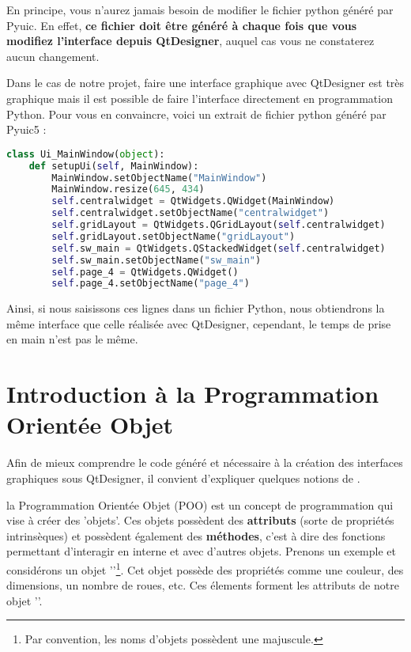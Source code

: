 \documentclass[12pt]{report}    %
\begin{document}
En  principe,  vous  n’aurez  jamais  besoin  de  modifier  le  fichier  python généré par Pyuic. En  effet, \textbf{{\color{red}ce  fichier  doit être généré à chaque  fois  que  vous  modifiez l’interface depuis QtDesigner}}, auquel cas vous ne constaterez aucun changement. \newline

Dans le cas de notre projet, faire une interface graphique avec QtDesigner est très graphique mais il est possible de faire l'interface directement en programmation Python. \newline
Pour vous en convaincre, voici un extrait de fichier python généré par Pyuic5 : \newline

\begin{lstlisting}[language=python]
class Ui_MainWindow(object):
    def setupUi(self, MainWindow):
        MainWindow.setObjectName("MainWindow")
        MainWindow.resize(645, 434)
        self.centralwidget = QtWidgets.QWidget(MainWindow)
        self.centralwidget.setObjectName("centralwidget")
        self.gridLayout = QtWidgets.QGridLayout(self.centralwidget)
        self.gridLayout.setObjectName("gridLayout")
        self.sw_main = QtWidgets.QStackedWidget(self.centralwidget)
        self.sw_main.setObjectName("sw_main")
        self.page_4 = QtWidgets.QWidget()
        self.page_4.setObjectName("page_4")
\end{lstlisting}
Ainsi, si nous saisissons ces lignes dans un fichier Python, nous obtiendrons la même interface que celle réalisée avec QtDesigner, cependant, le temps de prise en main n'est pas le même. \newline

\section{Introduction à la Programmation Orientée Objet}
Afin de mieux comprendre le code généré et nécessaire à la création des interfaces graphiques sous QtDesigner, il convient d'expliquer quelques notions de . \newline

la Programmation Orientée Objet (POO) est un concept de programmation qui vise à créer des 'objets'. \newline \newline
Ces objets possèdent des \textbf{attributs} (sorte de propriétés intrinsèques) et possèdent également des \textbf{méthodes}, c'est à dire des fonctions permettant d'interagir en interne et avec d'autres objets. \newline \newline
Prenons un exemple et considérons un objet ''\footnote{Par convention, les noms d'objets possèdent une majuscule.}. \newline
Cet objet possède des propriétés comme une couleur, des dimensions, un nombre de roues, etc. Ces élements forment les attributs de notre objet ''. \newline
\end{document}

